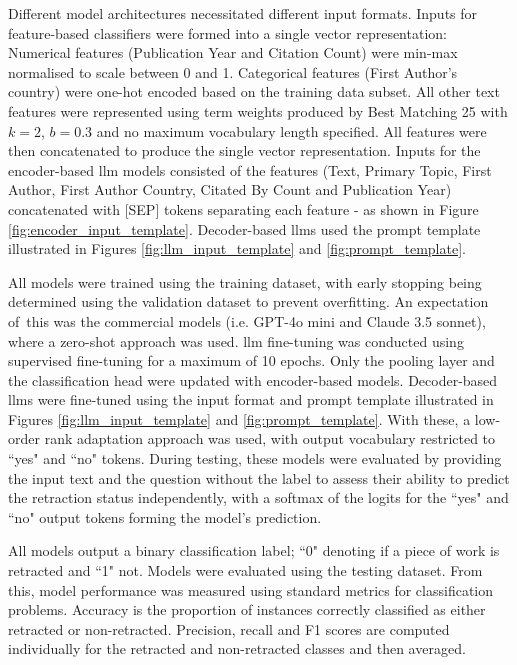 \documentclass[pdflatex,sn-mathphys-num]{sn-jnl}
\begin{document}
Different model architectures necessitated different input formats. Inputs for feature-based classifiers were formed into a single vector representation: Numerical features (Publication Year and Citation Count) were min-max normalised to scale between 0 and 1. Categorical features (First Author's country) were one-hot encoded based on the training data subset. All other text features were represented using term weights produced by Best Matching 25 \cite{INR-019} with $k = 2$, $b = 0.3$ and no maximum vocabulary length specified. All features were then concatenated to produce the single vector representation. Inputs for the encoder-based \gls*{llm} models consisted of the features (Text, Primary Topic, First Author, First Author Country, Citated By Count and Publication Year) concatenated with [SEP] tokens separating each feature - as shown in Figure \ref{fig:encoder_input_template}. Decoder-based \glspl*{llm}  used the prompt template illustrated in Figures \ref{fig:llm_input_template} and \ref{fig:prompt_template}.


All models were trained using the training dataset, with early stopping being determined using the validation dataset to prevent overfitting. An expectation of this was the commercial models (i.e. GPT-4o mini and Claude 3.5 sonnet), where a zero-shot approach was used. \gls*{llm} fine-tuning was conducted using supervised fine-tuning for a maximum of 10 epochs. Only the pooling layer and the classification head were updated with encoder-based models. Decoder-based \glspl*{llm} were fine-tuned using the input format and prompt template illustrated in Figures \ref{fig:llm_input_template} and \ref{fig:prompt_template}. With these, a low-order rank adaptation approach was used, with output vocabulary restricted to ``yes" and ``no" tokens. During testing, these models were evaluated by providing the input text and the question without the label to assess their ability to predict the retraction status independently, with a softmax of the logits for the ``yes" and ``no" output tokens forming the model's prediction.

All models output a binary classification label; ``0" denoting if a piece of work is retracted and ``1" not. Models were evaluated using the testing dataset. From this, model performance was measured using standard metrics for classification problems. Accuracy is the proportion of instances correctly classified as either retracted or non-retracted. Precision, recall and F1 scores are computed individually for the retracted and non-retracted classes and then averaged.
\end{document}
